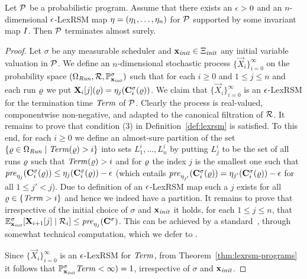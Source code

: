 \begin{theorem}
\label{thm:lexrsm-programs}
Let $\mathcal{P}$ be a probabilistic program. Assume that there exists an $\epsilon>0$ 
and an $n$-dimensional $\epsilon$-LexRSM map $\mathbf{\eta}=(\eta_1,\dots,\eta_n)$ for 
$\mathcal{P}$ supported 
by some 
invariant map $I$. 
Then $\mathcal{P}$ terminates almost surely.
\end{theorem}
\begin{proof}
Let $\sigma$ be any measurable scheduler and $\mathbf{x}_{\mathit{init}}\in\Xi_{\mathit{init}}$ any 
initial variable valuation in $\mathcal{P}$.
We define an $n$-dimensional stochastic process 
$\{\vec{X}_{i}\}_{i=0}^{\infty} $ on the probability space 
$(\Omega_{\mathit{Run}},\mathcal{R},\mathbb{P}^{\sigma}_{\mathbf{x}_{\mathit{init}}})$ such 
that for each 
$i\geq 0$ and $1\leq j 
\leq n$ and each run $\varrho$ we put $\mathbf{X}_{i}[j](\varrho) = 
\eta_j(\mathbf{C}^{\sigma}_{i}(\varrho))$. We claim that $\{\vec{X}_{i}\}_{i=0}^{\infty}$ 
is an $\epsilon$-LexRSM for the termination time $\mathit{Term}$ of $\mathcal{P}$. Clearly 
the process is real-valued, componentwise non-negative, and adapted to the 
canonical filtration of $\mathcal{R}$. It remains to prove that condition (3) in 
Definition~\ref{def:lexrsm} is satisfied. To this end, for each $i\geq 0$ we 
define an almost-sure partition of the set $\{\varrho\in \Omega_{\mathit{Run}}\mid 
\mathit{Term}(\varrho) >i\}$ into sets $L^{i}_1,\dots,L^{i}_n$ by putting $L^i_j$ to be 
the set of all runs $\varrho$ such that $\mathit{Term}(\varrho)>i$ and for $\varrho$ the index 
$j$ is the smallest one such that $\mathit{pre}_{\eta_j}(\mathbf{C}^{\sigma}_{i}(\varrho)) \leq 
\eta_j(\mathbf{C}^{\sigma}_{i}(\varrho))-\epsilon$ (which entails 
$\mathit{pre}_{\eta_{j'}}(\mathbf{C}^{\sigma}_{i}(\varrho)) =
\eta_{j'}(\mathbf{C}^{\sigma}_{i}(\varrho))-\epsilon$ for all $1\leq j'< j$). Due to 
definition of an $\epsilon$-LexRSM map such a $j$ exists for all 
$\varrho\in\{\mathit{Term}>i\}$ and hence we indeed have a partition. It remains to prove 
that irrespective of the initial choice of $\sigma$ and $\mathbf{x}_{\mathit{init}}$ it holds, 
for each $1\leq j 
\leq n$, that $\mathbb{E}^\sigma_{\mathbf{x}_{\mathit{init}}}[\mathbf{X}_{i+1}[j]\mid 
\mathcal{R}_i]\leq\mathit{pre}_{\eta_{j}}(\mathbf{C}^{\sigma}_{}) $. This can be achieved by a 
standard~\cite{xxx}, through somewhat technical computation, which we defer to 
\AppendixMaterial.

Since  $\{\vec{X}_{i}\}_{i=0}^{\infty}$ 
is an $\epsilon$-LexRSM for $\mathit{Term}$, from Theorem~\ref{thm:lexrsm-programs} it 
follows that $\mathbb{P}^{\sigma}_{\mathbf{x}_{\mathit{init}}}\mathit{Term} <\infty) =1$, irrespective of 
$\sigma$ and $\mathbf{x}_{\mathit{init}}$.
\end{proof} 

